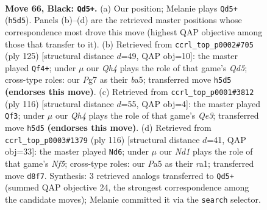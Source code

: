 \documentclass[11pt]{article}
\begin{document}
\clearpage

\begin{figure}[p]\centering
\begin{subfigure}{0.46\textwidth}\centering
\resizebox{\linewidth}{!}{%
\newchessgame
\chessboard[
  setfen={3n2Q1/2k3p1/1pp3p1/p1p4q/8/2P5/KP6/8 b - - 3 66},
  showmover=false,
  pgfstyle=straightmove, color=movearrow, markmove={h5-d5}
]}
\caption{}
\end{subfigure}\hfill
\begin{subfigure}{0.46\textwidth}\centering
\resizebox{\linewidth}{!}{%
\newchessgame
\chessboard[
  setfen={2Q5/3n4/3k1p1p/BP2p1p1/3q4/7P/6PK/8 b - - 19 63},
  showmover=false,
  pgfstyle=straightmove, color=movearrow, markmove={d4-f4}
]}
\caption{}
\end{subfigure}
\\[4pt]
\begin{subfigure}{0.46\textwidth}\centering
\resizebox{\linewidth}{!}{%
\newchessgame
\chessboard[
  setfen={8/6k1/6p1/3q3p/8/4Q1PP/5PK1/8 w - - 10 59},
  showmover=false,
  pgfstyle=straightmove, color=movearrow, markmove={e3-f3}
]}
\caption{}
\end{subfigure}\hfill
\begin{subfigure}{0.46\textwidth}\centering
\resizebox{\linewidth}{!}{%
\newchessgame
\chessboard[
  setfen={5q1k/7p/7P/5NQ1/5P2/4P3/5KP1/r7 w - - 5 59},
  showmover=false,
  pgfstyle=straightmove, color=movearrow, markmove={f5-d6}
]}
\caption{}
\end{subfigure}
\caption{\textbf{Move 66, Black: \texttt{Qd5+}.} (a) Our position; Melanie plays \texttt{Qd5+} (\texttt{h5d5}). Panels (b)--(d) are the retrieved master positions whose correspondence most drove this move (highest QAP objective among those that transfer to it). (b) Retrieved from \texttt{ccrl\_top\_p0002\#705} (ply 125) [structural distance $d$=49, QAP obj=10]: the master played \texttt{Qf4+}; under $\mu$ our \emph{Qh4} plays the role of that game's \emph{Qd5}; cross-type roles: our \emph{P}g7 as their \emph{b}a5; transferred move \texttt{h5d5} \textbf{(endorses this move)}. (c) Retrieved from \texttt{ccrl\_top\_p0001\#3812} (ply 116) [structural distance $d$=55, QAP obj=4]: the master played \texttt{Qf3}; under $\mu$ our \emph{Qh4} plays the role of that game's \emph{Qe3}; transferred move \texttt{h5d5} \textbf{(endorses this move)}. (d) Retrieved from \texttt{ccrl\_top\_p0003\#1379} (ply 116) [structural distance $d$=41, QAP obj=33]: the master played \texttt{Nd6}; under $\mu$ our \emph{Nd1} plays the role of that game's \emph{Nf5}; cross-type roles: our \emph{P}a5 as their \emph{r}a1; transferred move \texttt{d8f7}. Synthesis: 3 retrieved analogs transferred to \texttt{Qd5+} (summed QAP objective 24, the strongest correspondence among the candidate moves); Melanie committed it via the \texttt{search} selector.}
\label{fig:thought-m131}
\end{figure}
\end{document}
